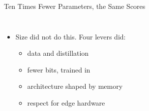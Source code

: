 \begin{frame}{Ten Times Fewer Parameters, the Same Scores}
\begin{columns}[T,onlytextwidth]
\begin{itemize}
            \item Size did not do this. Four levers did:
            \begin{itemize}\itemsep0.15em
                \item data and distillation
                \item fewer bits, trained in
                \item architecture shaped by memory
                \item respect for edge hardware
            \end{itemize}
        \end{itemize}
    \end{columns}
\end{frame}

